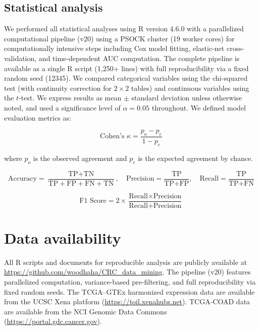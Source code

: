 \documentclass[fleqn,10pt]{wlscirep}
\begin{document}
\subsection*{Statistical analysis}

We performed all statistical analyses using R version 4.6.0 with a parallelized computational pipeline (v20) using a PSOCK cluster (19 worker cores) for computationally intensive steps including Cox model fitting, elastic-net cross-validation, and time-dependent AUC computation. The complete pipeline is available as a single R script (1,250+ lines) with full reproducibility via a fixed random seed (12345). We compared categorical variables using the chi-squared test (with continuity correction for $2 \times 2$ tables) and continuous variables using the $t$-test. We express results as mean $\pm$ standard deviation unless otherwise noted, and used a significance level of $\alpha = 0.05$ throughout. We defined model evaluation metrics as:

\begin{equation}\label{kappa}
\text{Cohen's } \kappa = \frac{p_o - p_e}{1 - p_e}
\end{equation}

where $p_o$ is the observed agreement and $p_e$ is the expected agreement by chance.

\begin{equation}\label{metrics}
\text{Accuracy} = \frac{\text{TP} + \text{TN}}{\text{TP} + \text{FP} + \text{FN} + \text{TN}}, \quad
\text{Precision} = \frac{\text{TP}}{\text{TP} + \text{FP}}, \quad
\text{Recall} = \frac{\text{TP}}{\text{TP} + \text{FN}}
\end{equation}

\begin{equation}\label{F1}
\text{F1 Score} = 2 \times \frac{\text{Recall} \times \text{Precision}}{\text{Recall} + \text{Precision}}
\end{equation}

\section*{Data availability}

All R scripts and documents for reproducible analysis are publicly available at \url{https://github.com/woodhaha/CRC_data_mining}. The pipeline (v20) features parallelized computation, variance-based pre-filtering, and full reproducibility via fixed random seeds. The TCGA--GTEx harmonized expression data are available from the UCSC Xena platform (\url{https://toil.xenahubs.net}). TCGA-COAD data are available from the NCI Genomic Data Commons (\url{https://portal.gdc.cancer.gov}).
\end{document}
